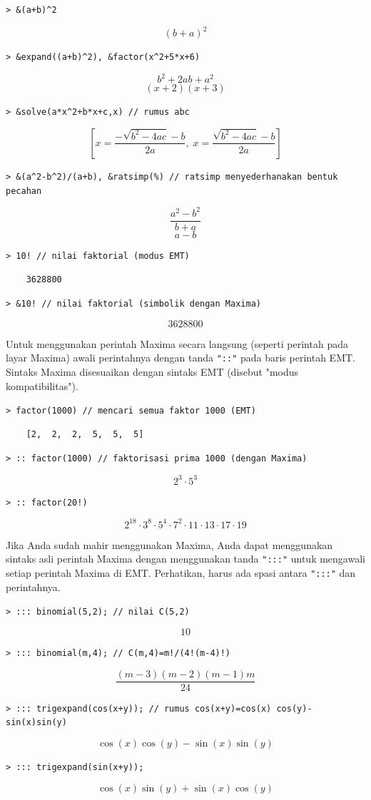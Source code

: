 \documentclass[11pt, a4paper]{article}
\newcommand{\emtcmd}[1]{\noindent\texttt{\textcolor{emtcommand}{>}\ #1}\par\smallskip}
\begin{document}
\emtcmd{\&(a+b)\^{}2}
$$(b + a)^2$$

\emtcmd{\&expand((a+b)\^{}2), \&factor(x\^{}2+5*x+6)}
$$b^2 + 2ab + a^2$$
$$(x + 2)(x + 3)$$

\emtcmd{\&solve(a*x\^{}2+b*x+c,x) \textcolor{emtcomment}{// rumus abc}}
$$\left[x = \frac{-\sqrt{b^2 - 4ac} - b}{2a}, \; x = \frac{\sqrt{b^2 - 4ac} - b}{2a}\right]$$

\emtcmd{\&(a\^{}2-b\^{}2)/(a+b), \&ratsimp(\%) \textcolor{emtcomment}{// ratsimp menyederhanakan bentuk pecahan}}
$$\frac{a^2 - b^2}{b + a}$$
$$a - b$$

\emtcmd{10! \textcolor{emtcomment}{// nilai faktorial (modus EMT)}}
\begin{verbatim}
    3628800
\end{verbatim}

\emtcmd{\&10! \textcolor{emtcomment}{// nilai faktorial (simbolik dengan Maxima)}}
$$3628800$$

Untuk menggunakan perintah Maxima secara langsung (seperti perintah pada layar Maxima) awali perintahnya dengan tanda \texttt{"::"} pada baris perintah EMT. Sintaks Maxima disesuaikan dengan sintaks EMT (disebut "modus kompatibilitas").

\emtcmd{factor(1000) \textcolor{emtcomment}{// mencari semua faktor 1000 (EMT)}}
\begin{verbatim}
    [2,  2,  2,  5,  5,  5]
\end{verbatim}

\emtcmd{:: factor(1000) \textcolor{emtcomment}{// faktorisasi prima 1000 (dengan Maxima)}}
$$2^3 \cdot 5^3$$

\emtcmd{:: factor(20!)}
$$2^{18} \cdot 3^8 \cdot 5^4 \cdot 7^2 \cdot 11 \cdot 13 \cdot 17 \cdot 19$$

Jika Anda sudah mahir menggunakan Maxima, Anda dapat menggunakan sintaks asli perintah Maxima dengan menggunakan tanda \texttt{":::"} untuk mengawali setiap perintah Maxima di EMT. Perhatikan, harus ada spasi antara \texttt{":::"} dan perintahnya.

\emtcmd{::: binomial(5,2); \textcolor{emtcomment}{// nilai C(5,2)}}
$$10$$

\emtcmd{::: binomial(m,4); \textcolor{emtcomment}{// C(m,4)=m!/(4!(m-4)!)}}
$$\frac{(m - 3)(m - 2)(m - 1)m}{24}$$

\emtcmd{::: trigexpand(cos(x+y)); \textcolor{emtcomment}{// rumus cos(x+y)=cos(x) cos(y)-sin(x)sin(y)}}
$$\cos(x)\cos(y) - \sin(x)\sin(y)$$

\emtcmd{::: trigexpand(sin(x+y));}
$$\cos(x)\sin(y) + \sin(x)\cos(y)$$
\end{document}
